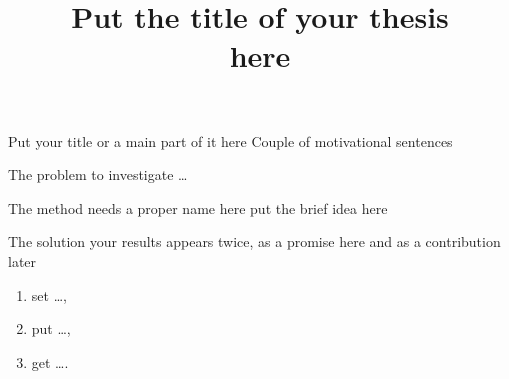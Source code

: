 \documentclass[12pt,pdf,hyperref={unicode}]{beamer}
\title{ Put the title of your thesis \\ here}
\begin{document}
\setcounter{page}{2}%
\begin{frame}{Put your title or a main part of it  here}
Couple of motivational sentences
\begin{block}{The problem}
to investigate \ldots 
\end{block}
\begin{block}{The method needs a proper name here}
put the brief idea here
\end{block}
\begin{block}{The solution} your results appears twice, as a promise here and as a contribution later
\begin{enumerate}[1)]
\item set \ldots,
\item put \ldots,
\item get \ldots.
\end{enumerate}
\end{block}
\end{frame}
\end{document}
